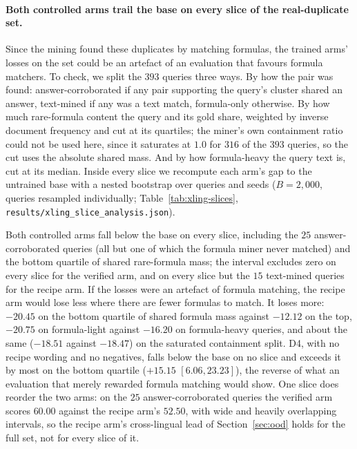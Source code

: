 \paragraph{Both controlled arms trail the base on every slice of the real-duplicate set.}
Since the mining found these duplicates by matching formulas, the trained arms' losses on the set could be an artefact of an evaluation that favours formula matchers. To check, we split the $393$ queries three ways. By how the pair was found: answer-corroborated if any pair supporting the query's cluster shared an answer, text-mined if any was a text match, formula-only otherwise. By how much rare-formula content the query and its gold share, weighted by inverse document frequency and cut at its quartiles; the miner's own containment ratio could not be used here, since it saturates at $1.0$ for $316$ of the $393$ queries, so the cut uses the absolute shared mass. And by how formula-heavy the query text is, cut at its median. Inside every slice we recompute each arm's gap to the untrained base with a nested bootstrap over queries and seeds ($B = 2{,}000$, queries resampled individually; Table~\ref{tab:xling-slices}, \texttt{results/xling\_slice\_analysis.json}).

Both controlled arms fall below the base on every slice, including the $25$ answer-corroborated queries (all but one of which the formula miner never matched) and the bottom quartile of shared rare-formula mass; the interval excludes zero on every slice for the verified arm, and on every slice but the $15$ text-mined queries for the recipe arm. If the losses were an artefact of formula matching, the recipe arm would lose less where there are fewer formulas to match. It loses more: $-20.45$ on the bottom quartile of shared formula mass against $-12.12$ on the top, $-20.75$ on formula-light against $-16.20$ on formula-heavy queries, and about the same ($-18.51$ against $-18.47$) on the saturated containment split. D4, with no recipe wording and no negatives, falls below the base on no slice and exceeds it by most on the bottom quartile ($+15.15$ $[6.06, 23.23]$), the reverse of what an evaluation that merely rewarded formula matching would show. One slice does reorder the two arms: on the $25$ answer-corroborated queries the verified arm scores $60.00$ against the recipe arm's $52.50$, with wide and heavily overlapping intervals, so the recipe arm's cross-lingual lead of Section~\ref{sec:ood} holds for the full set, not for every slice of it.

